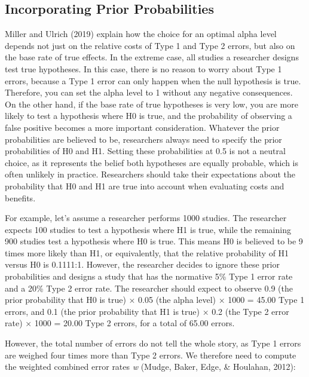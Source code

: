 \documentclass[
  english,
  ,jou, a4paper,floatsintext]{apa6}
\begin{document}
\hypertarget{incorporating-prior-probabilities}{%
\subsection{Incorporating Prior Probabilities}\label{incorporating-prior-probabilities}}

Miller and Ulrich (2019) explain how the choice for an optimal alpha level depends not just on the relative costs of Type 1 and Type 2 errors, but also on the base rate of true effects. In the extreme case, all studies a researcher designs test true hypotheses. In this case, there is no reason to worry about Type 1 errors, because a Type 1 error can only happen when the null hypothesis is true. Therefore, you can set the alpha level to 1 without any negative consequences. On the other hand, if the base rate of true hypotheses is very low, you are more likely to test a hypothesis where H0 is true, and the probability of observing a false positive becomes a more important consideration. Whatever the prior probabilities are believed to be, researchers always need to specify the prior probabilities of H0 and H1. Setting these probabilities at 0.5 is not a neutral choice, as it represents the belief both hypotheses are equally probable, which is often unlikely in practice. Researchers should take their expectations about the probability that H0 and H1 are true into account when evaluating costs and benefits.

For example, let's assume a researcher performs 1000 studies. The researcher expects 100 studies to test a hypothesis where H1 is true, while the remaining 900 studies test a hypothesis where H0 is true. This means H0 is believed to be 9 times more likely than H1, or equivalently, that the relative probability of H1 versus H0 is 0.1111:1. However, the researcher decides to ignore these prior probabilities and designs a study that has the normative 5\% Type 1 error rate and a 20\% Type 2 error rate. The researcher should expect to observe 0.9 (the prior probability that H0 is true) × 0.05 (the alpha level) × 1000 = 45.00 Type 1 errors, and 0.1 (the prior probability that H1 is true) × 0.2 (the Type 2 error rate) × 1000 = 20.00 Type 2 errors, for a total of 65.00 errors.

However, the total number of errors do not tell the whole story, as Type 1 errors are weighed four times more than Type 2 errors. We therefore need to compute the weighted combined error rates \emph{w} (Mudge, Baker, Edge, \& Houlahan, 2012):
\end{document}
